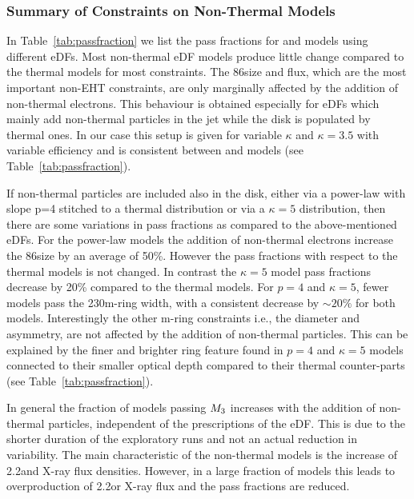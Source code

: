 \subsubsection{Summary of Constraints on Non-Thermal Models}



In Table~\ref{tab:passfraction} we list the pass fractions for \bhac and \hamr models using different eDFs.
Most non-thermal eDF models produce little change compared to the thermal models for most constraints.
The 86\GHz size and flux, which are the most important non-EHT constraints, are only marginally affected by the addition of non-thermal electrons.
This behaviour is obtained especially for eDFs which mainly add non-thermal particles in the jet while the disk is populated by thermal ones.
In our case this setup is given for variable $\kappa$ and $\kappa=3.5$ with variable efficiency and is consistent between \bhac and \hamr models (see Table~\ref{tab:passfraction}).

If non-thermal particles are included also in the disk, either via a power-law with slope p=4 stitched to a thermal distribution or via a $\kappa=5$ distribution, then there are some variations in pass fractions as compared to the above-mentioned eDFs.  For the power-law models the addition of non-thermal electrons increase the 86\GHz size by an average of 50\%.
However the pass fractions with respect to the thermal models is not changed.
In contrast the $\kappa=5$ model pass fractions decrease by 20\% compared to the thermal models.
For $p=4$ and $\kappa=5$, fewer models pass the 230\GHz m-ring width, with a consistent decrease by $\sim20\%$ for both models.
Interestingly the other m-ring constraints i.e., the diameter and asymmetry, are not affected by the addition of non-thermal particles.
This can be explained by the finer and brighter ring feature found in $p=4$ and $\kappa=5$ models connected to their smaller optical depth compared to their thermal counter-parts (see Table~\ref{tab:passfraction}).

In general the fraction of models passing $M_{3}$ increases with the addition of non-thermal particles, independent of the prescriptions of the eDF.  This is due to the shorter duration of the exploratory runs and not an actual reduction in variability.   The main characteristic of the non-thermal models is the increase of 2.2\um and X-ray flux densities. However, in a large fraction of models this leads to overproduction of 2.2\um or X-ray flux and the pass fractions are reduced.

